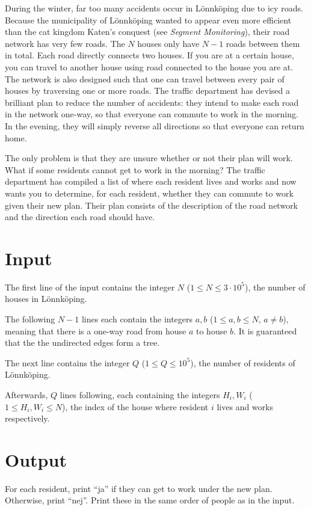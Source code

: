 
\noindent
During the winter, far too many accidents occur in Lönnköping due to icy roads.
Because the municipality of Lönnköping wanted to appear even more efficient than the cat
kingdom Katen's conquest (see \textit{Segment Monitoring}), their road network has very
few roads. The $N$ houses only have $N-1$ roads between them in total. Each road directly
connects two houses. If you are at a certain house, you can travel to another house using
road connected to the house you are at. The network is also designed such that one can
travel between every pair of houses by traversing one or more roads. The traffic department
has devised a brilliant plan to reduce the number of accidents: they intend to make each road
in the network one-way, so that everyone can commute to work in the morning. In the evening,
they will simply reverse all directions so that everyone can return home.

The only problem is that they are unsure whether or not their plan will work. What if some
residents cannot get to work in the morning? The traffic department has compiled a list of
where each resident lives and works and now wants you to determine, for each resident, whether
they can commute to work given their new plan. Their plan consists of the description of
the road network and the direction each road should have.

\section*{Input}
The first line of the input contains the integer $N$ ($1 \le N \le 3 \cdot 10^5$), the number of
houses in Lönnköping.

The following $N-1$ lines each contain the integers $a,b$ ($1 \leq a,b \leq N$, $a \neq b$),
meaning that there is a one-way road from house $a$ to house $b$. It is
guaranteed that the the undirected edges form a tree.

The next line contains the integer $Q$ ($1 \leq Q \leq 10^5$), the number of residents of Lönnköping.

Afterwards, $Q$ lines following, each containing the integers $H_i,W_i$ ($1 \leq H_i,W_i \leq N$),
the index of the house where resident $i$ lives and works respectively.

\section*{Output}
For each resident, print ``ja'' if they can get to work under the new plan. Otherwise,
print ``nej''. Print these in the same order of people as in the input.

